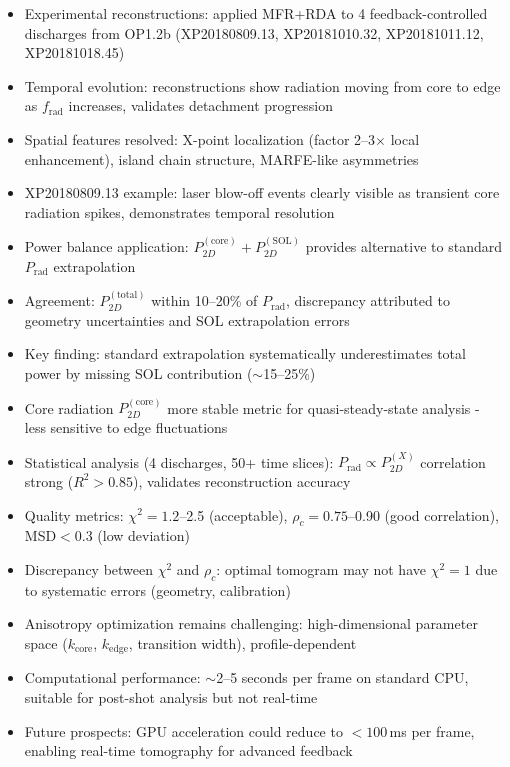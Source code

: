\documentclass[11pt,a4paper]{article}
\begin{document}
\begin{itemize}
\item Experimental reconstructions: applied MFR+RDA to 4 feedback-controlled discharges from OP1.2b (XP20180809.13, XP20181010.32, XP20181011.12, XP20181018.45)
\item Temporal evolution: reconstructions show radiation moving from core to edge as $f_{\text{rad}}$ increases, validates detachment progression
\item Spatial features resolved: X-point localization (factor 2--3$\times$ local enhancement), island chain structure, MARFE-like asymmetries
\item XP20180809.13 example: laser blow-off events clearly visible as transient core radiation spikes, demonstrates temporal resolution
\item Power balance application: $P_{2D}^{(\text{core})} + P_{2D}^{(\text{SOL})}$ provides alternative to standard $P_{\text{rad}}$ extrapolation
\item Agreement: $P_{2D}^{(\text{total})}$ within 10--20\% of $P_{\text{rad}}$, discrepancy attributed to geometry uncertainties and SOL extrapolation errors
\item Key finding: standard extrapolation systematically underestimates total power by missing SOL contribution ($\sim$15--25\%)
\item Core radiation $P_{2D}^{(\text{core})}$ more stable metric for quasi-steady-state analysis - less sensitive to edge fluctuations
\item Statistical analysis (4 discharges, 50+ time slices): $P_{\text{rad}} \propto P_{2D}^{(X)}$ correlation strong ($R^2>0.85$), validates reconstruction accuracy
\item Quality metrics: $\chi^2=1.2$--2.5 (acceptable), $\rho_c=0.75$--0.90 (good correlation), MSD$<0.3$ (low deviation)
\item Discrepancy between $\chi^2$ and $\rho_c$: optimal tomogram may not have $\chi^2=1$ due to systematic errors (geometry, calibration)
\item Anisotropy optimization remains challenging: high-dimensional parameter space ($k_{\text{core}}$, $k_{\text{edge}}$, transition width), profile-dependent
\item Computational performance: $\sim$2--5 seconds per frame on standard CPU, suitable for post-shot analysis but not real-time
\item Future prospects: GPU acceleration could reduce to $<100$\,ms per frame, enabling real-time tomography for advanced feedback
\end{itemize}
\end{document}
